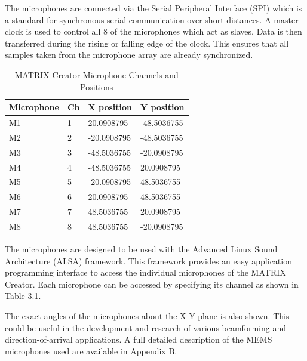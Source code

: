 \documentclass[hidelinks,12pt]{report} %
\begin{document}
The microphones are connected via the Serial Peripheral Interface (SPI) which is a standard for synchronous serial communication over short distances\cite{27}. A master clock is used to control all 8 of the microphones which act as slaves. Data is then transferred during the rising or falling edge of the clock. This ensures that all samples taken from the microphone array are already synchronized. 



\begin{table}[]
\begin{center}
\begin{tabular}{|l|l|l|l|}
\hline
\textbf{Microphone} & \textbf{Ch} & \textbf{X position} & \textbf{Y position} \\ \hline
M1                  & 1           & 20.0908795          & -48.5036755         \\ \hline
M2                  & 2           & -20.0908795         & -48.5036755         \\ \hline
M3                  & 3           & -48.5036755         & -20.0908795         \\ \hline
M4                  & 4           & -48.5036755         & 20.0908795          \\ \hline
M5                  & 5           & -20.0908795         & 48.5036755          \\ \hline
M6                  & 6           & 20.0908795          & 48.5036755          \\ \hline
M7                  & 7           & 48.5036755          & 20.0908795          \\ \hline
M8                  & 8           & 48.5036755          & -20.0908795         \\ \hline
\end{tabular}
\label{tab:tablelabel}
\caption{MATRIX Creator Microphone Channels and Positions}
\end{center}
\end{table}

The microphones are designed to be used with the Advanced Linux Sound Architecture (ALSA) framework. This framework provides an easy application programming interface to access the individual microphones of the MATRIX Creator. Each microphone can be accessed by specifying its channel as shown in Table 3.1. 

The exact angles of the microphones about the X-Y plane is also shown. This could be useful in the development and research of various beamforming and direction-of-arrival applications. A full detailed description of the MEMS microphones used are available in Appendix B.
\end{document}
